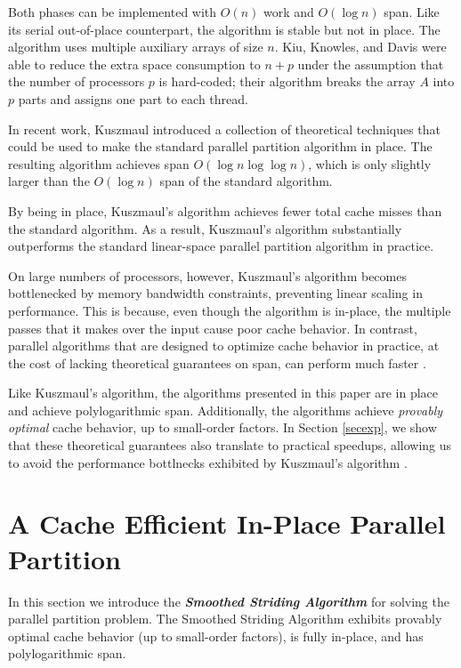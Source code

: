 \documentclass[11pt]{article}
\newcommand{\defn}[1]{{\textit{\textbf{\boldmath #1}}}}
\renewcommand{\paragraph}[1]{\vspace{0.09in}\noindent{\bf \boldmath #1.}}
\theoremstyle{remark}
\theoremstyle{remark}
\begin{document}
Both phases can be implemented with $O(n)$ work and $O(\log n)$
span. Like its serial out-of-place counterpart, the algorithm is
stable but not in place. The algorithm uses multiple auxiliary arrays of
size $n$. Kiu, Knowles, and Davis \cite{LiuKn05} were able to reduce
the extra space consumption to $n + p$ under the assumption that the
number of processors $p$ is hard-coded; their algorithm breaks the
array $A$ into $p$ parts and assigns one part to each thread. 

\paragraph{An In-Place Parallel Partition}
In recent work, Kuszmaul \cite{Kuszmaul19} introduced a collection
of theoretical techniques that could be used to make the standard
parallel partition algorithm in place. The resulting algorithm
achieves span $O(\log n \log \log n)$, which is only slightly larger
than the $O(\log n)$ span of the standard algorithm.

By being in place, Kuszmaul's algorithm achieves fewer total cache
misses than the standard algorithm. As a result, Kuszmaul's algorithm
substantially outperforms the standard linear-space parallel partition
algorithm in practice.

On large numbers of processors, however, Kuszmaul's algorithm becomes
bottlenecked by memory bandwidth constraints, preventing linear
scaling in performance. This is because, even though the algorithm is
in-place, the multiple passes that it makes over the input cause poor
cache behavior. In contrast, parallel algorithms that are designed to
optimize cache behavior in practice, at the cost of lacking
theoretical guarantees on span, can perform much faster
\cite{FrancisPa92, Frias08}.

Like Kuszmaul's algorithm, the algorithms presented in this paper are
in place and achieve polylogarithmic span. Additionally, the
algorithms achieve \emph{provably optimal} cache behavior, up to
small-order factors. In Section \ref{secexp}, we show that these
theoretical guarantees also translate to practical speedups, allowing
us to avoid the performance bottlnecks exhibited by Kuszmaul's
algorithm \cite{Kuszmaul19}.



\section{A Cache Efficient In-Place Parallel Partition}\label{sec:smoothing}
In this section we introduce the \defn{Smoothed Striding Algorithm} for solving
the parallel partition problem. The Smoothed Striding Algorithm exhibits
provably optimal cache behavior (up to small-order factors), is fully in-place,
and has polylogarithmic span.
\end{document}
